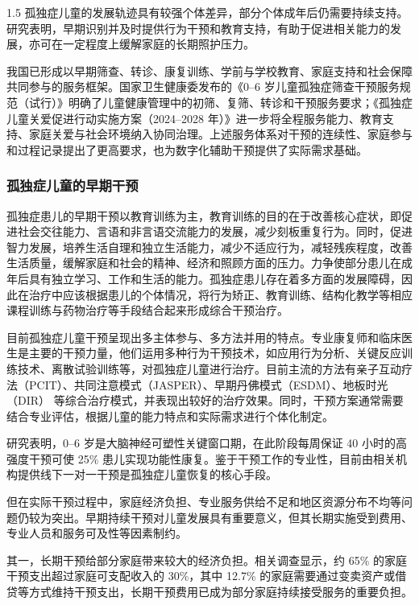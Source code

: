 \documentclass[zihao=-4]{ctexart}
\begin{document}
\begin{spacing}{1.5}
孤独症儿童的发展轨迹具有较强个体差异，部分个体成年后仍需要持续支持。研究表明，早期识别并及时提供行为干预和教育支持，有助于促进相关能力的发展，亦可在一定程度上缓解家庭的长期照护压力\cite{ref6}。

我国已形成以早期筛查、转诊、康复训练、学前与学校教育、家庭支持和社会保障共同参与的服务框架。国家卫生健康委发布的《0--6 岁儿童孤独症筛查干预服务规范（试行）》明确了儿童健康管理中的初筛、复筛、转诊和干预服务要求\cite{ref7}；《孤独症儿童关爱促进行动实施方案（2024--2028 年）》进一步将全程服务能力、教育支持、家庭关爱与社会环境纳入协同治理\cite{ref4}。上述服务体系对干预的连续性、家庭参与和过程记录提出了更高要求，也为数字化辅助干预提供了实际需求基础。

\subsubsection{孤独症儿童的早期干预}

孤独症患儿的早期干预以教育训练为主，教育训练的目的在于改善核心症状，即促进社会交往能力、言语和非言语交流能力的发展，减少刻板重复行为\cite{ref8}。同时，促进智力发展，培养生活自理和独立生活能力，减少不适应行为，减轻残疾程度，改善生活质量，缓解家庭和社会的精神、经济和照顾方面的压力。力争使部分患儿在成年后具有独立学习、工作和生活的能力。孤独症患儿存在着多方面的发展障碍，因此在治疗中应该根据患儿的个体情况，将行为矫正、教育训练、结构化教学等相应课程训练与药物治疗等手段结合起来形成综合干预治疗\cite{ref9}。

目前孤独症儿童干预呈现出多主体参与、多方法并用的特点。专业康复师和临床医生是主要的干预力量，他们运用多种行为干预技术，如应用行为分析、关键反应训练技术、离散试验训练等，对孤独症儿童进行治疗。目前主流的方法有亲子互动疗法（PCIT）\cite{ref10}、共同注意模式（JASPER）\cite{ref11}、早期丹佛模式（ESDM）\cite{ref12}、地板时光（DIR）\cite{ref13} 等综合治疗模式，并表现出较好的治疗效果。同时，干预方案通常需要结合专业评估，根据儿童的能力特点和实际需求进行个体化制定。

研究表明，0--6 岁是大脑神经可塑性关键窗口期，在此阶段每周保证 40 小时的高强度干预可使 25\% 患儿实现功能性康复\cite{ref14}。鉴于干预工作的专业性，目前由相关机构提供线下一对一干预是孤独症儿童恢复的核心手段。

但在实际干预过程中，家庭经济负担、专业服务供给不足和地区资源分布不均等问题仍较为突出。早期持续干预对儿童发展具有重要意义，但其长期实施受到费用、专业人员和服务可及性等因素制约。

其一，长期干预给部分家庭带来较大的经济负担。相关调查显示，约 65\% 的家庭干预支出超过家庭可支配收入的 30\%，其中 12.7\% 的家庭需要通过变卖资产或借贷等方式维持干预支出，长期干预费用已成为部分家庭持续接受服务的重要负担。


\end{spacing}
\end{document}
